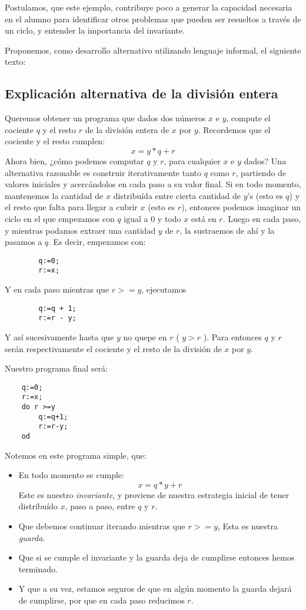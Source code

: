 \documentclass[11pt, a4paper, openany]{book}
\begin{document}
    Postulamos, que este ejemplo, contribuye poco a generar la capacidad necesaria en el alumno para identificar otros problemas que pueden ser resueltos a través de un ciclo, y entender la importancia del invariante.

    Proponemos, como desarrollo alternativo utilizando lenguaje informal, el siguiente texto:

    \subsection{Explicación alternativa de la división entera}
    Queremos obtener un programa que dados dos números $x$ e $y$, compute el cociente $q$ y el resto $r$ de la división entera de $x$ por $y$.
    Recordemos que el cociente y el resto cumplen:
    $$x = y * q + r$$
    Ahora bien, ¿cómo podemos computar $q$ y $r$, para cualquier $x$ e $y$ dados?
    Una alternativa razonable es construir iterativamente tanto $q$ como $r$, partiendo de valores iniciales y acercándolos en cada paso a su valor final.
    Si en todo momento, mantenemos la cantidad de $x$ distribuída entre cierta cantidad de $y$’s (esto es $q$) y el resto que falta para llegar a cubrir $x$ (esto es $r$), entonces podemos imaginar un ciclo en el que empezamos con $q$ igual a 0 y todo $x$ está en $r$.
    Luego en cada paso, y mientras podamos extraer una cantidad $y$ de $r$, la sustraemos de ahí y la pasamos a $q$.
    Es decir, empezamos con:
    \begin{verbatim}
        q:=0;
        r:=x;
    \end{verbatim}
    Y en cada paso mientras que $r >= y$, ejecutamos
    \begin{verbatim}
        q:=q + 1;
        r:=r - y;
    \end{verbatim}

    Y así sucesivamente hasta que $y$ no quepe en $r$ ( $ y > r $ ). Para entonces $q$ y $r$ serán respectivamente el cociente y el resto de la división de $x$ por $y$.

    Nuestro programa final será:
    \begin{verbatim}
    q:=0;
    r:=x;
    do r >=y
        q:=q+1;
        r:=r-y;
    od
    \end{verbatim}
    Notemos en este programa simple, que:
    \begin{itemize}
        \item En todo momento se cumple:
        $$x = q * y + r$$
        Este es nuestro \textit{invariante}, y proviene de nuestra estrategia inicial de tener distribuído $x$, paso a paso, entre $q$ y $r$.
        \item Que debemos continuar iterando mientras que $r >= y$,
        Esta es nuestra \textit{guarda}.
        \item Que si se cumple el invariante y la guarda deja de cumplirse entonces hemos terminado.
        \item Y que a su vez, estamos seguros de que en algún momento la guarda dejará de cumplirse, por que en cada paso reducimos $r$.
    \end{itemize}
\end{document}
